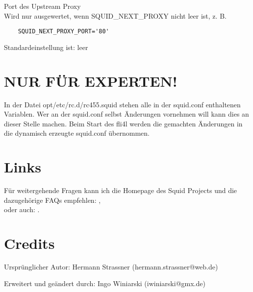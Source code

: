 \begin{description}
                Port des Upstream Proxy\\
                Wird nur ausgewertet, wenn
                SQUID\_NEXT\_PROXY nicht leer ist, z. B.
\begin{verbatim}
	SQUID_NEXT_PROXY_PORT='80'
\end{verbatim}

                Standardeinstellung ist: leer


\section{NUR FÜR EXPERTEN!}
In der Datei opt/etc/rc.d/rc455.squid stehen alle in der squid.conf enthaltenen
Variablen. Wer an der squid.conf selbst Änderungen vornehmen will kann dies an
dieser Stelle machen. Beim Start des fli4l werden die gemachten Änderungen in
die dynamisch erzeugte squid.conf übernommen.

\section{Links}
Für weitergehende Fragen kann ich die Homepage des Squid Projects und die
dazugehörige FAQs empfehlen: ,\\
oder auch: .

\section{Credits}
Ursprünglicher Autor: Hermann Strassner (hermann.strassner@web.de)

Erweitert und geändert durch: Ingo Winiarski (iwiniarski@gmx.de)
\end{description}
